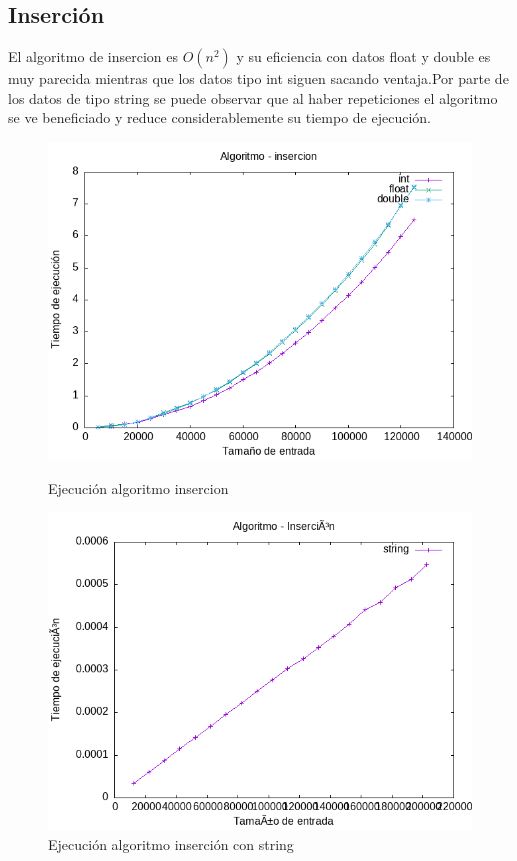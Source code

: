\documentclass[11pt]{article}
\begin{document}
\subsection*{Inserción}
El algoritmo de insercion es \(O(n^2)\) y su eficiencia con datos float y double es muy parecida mientras que los datos tipo int 
siguen sacando ventaja.Por parte de los datos de tipo string se puede observar que al haber repeticiones el algoritmo se ve beneficiado y reduce 
considerablemente su tiempo de ejecución.
\begin{figure}[H]
    \begin{minipage}{0.5\textwidth}
        \centering
        \includegraphics[width=\linewidth]{assets/Img/insercion.png}
        \caption{Ejecución algoritmo insercion}
        \label{fig:insercion}
    \end{minipage}%
    \begin{minipage}{0.5\textwidth}
        \centering
        \includegraphics[width=\linewidth]{assets/Img/insercionstring.png}
        \caption{Ejecución algoritmo inserción con string}
        \label{fig:insercionstring}
    \end{minipage}
\end{figure}
\end{document}
